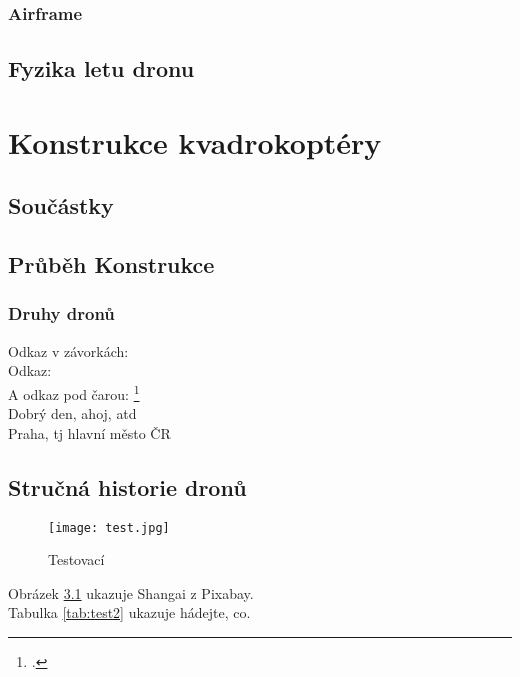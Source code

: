 \documentclass[12pt]{report}
\begin{document}
\section{Airframe}


\lipsum[3]

\chapter{Fyzika letu dronu}

\lipsum[1]

\part{Konstrukce kvadrokoptéry} %

\chapter{Součástky}
\lipsum[1]	

\chapter{Průběh Konstrukce}

\lipsum[1]	

\section{Druhy dronů}
	Odkaz v závorkách: \parencite[see][page 900]{einstein}\\
	Odkaz: \cite{knuthwebsite}\\
	A odkaz pod čarou: \footcite[see][s. 42]{latexcompanion}\\
	Dobrý den, ahoj, \gls{atd}\\
	Praha, \gls{tj} hlavní město ČR
	



\chapter[Stručná historie dronů]{Stručná historie dronů}
\begin{figure}
  \texttt{[image: test.jpg]}
  \caption{Testovací}
  \label{fig:test}
\end{figure}
Obrázek \ref{fig:test} ukazuje Shangai z Pixabay.\\
Tabulka \ref{tab:test2} ukazuje hádejte, co.
	
\end{document}
